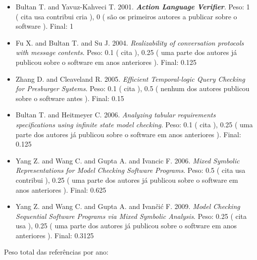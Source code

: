 \begin{itemize}
\item Bultan T. and Yavuz-Kahveci T.
      2001.
        \textbf{\textit{ Action Language Verifier}}.
      Peso:
      1 (
          cita
          usa
          contribui
          cria
      ),
      0 (
são os primeiros autores a publicar sobre o software
      ).
      Final:
      1

\item Fu X. and Bultan T. and Su J.
      2004.
        \textit{ Realizability of conversation protocols with message contents}.
      Peso:
      0.1 (
          cita
      ),
      0.25 (
uma parte dos autores já publicou sobre o software em anos anteriores
      ).
      Final:
      0.125

\item Zhang D. and Cleaveland R.
      2005.
        \textit{ Efficient Temporal-logic Query Checking for Presburger Systems}.
      Peso:
      0.1 (
          cita
      ),
      0.5 (
nenhum dos autores publicou sobre o software antes
      ).
      Final:
      0.15

\item Bultan T. and Heitmeyer C.
      2006.
        \textit{ Analyzing tabular requirements specifications using infinite state model checking}.
      Peso:
      0.1 (
          cita
      ),
      0.25 (
uma parte dos autores já publicou sobre o software em anos anteriores
      ).
      Final:
      0.125

\item Yang Z. and Wang C. and Gupta A. and Ivancic F.
      2006.
        \textit{ Mixed Symbolic Representations for Model Checking Software Programs}.
      Peso:
      0.5 (
          cita
          usa
          contribui
      ),
      0.25 (
uma parte dos autores já publicou sobre o software em anos anteriores
      ).
      Final:
      0.625

\item Yang Z. and Wang C. and Gupta A. and Ivan\v{c}i\'{c} F.
      2009.
        \textit{ Model Checking Sequential Software Programs via Mixed Symbolic Analysis}.
      Peso:
      0.25 (
          cita
          usa
      ),
      0.25 (
uma parte dos autores já publicou sobre o software em anos anteriores
      ).
      Final:
      0.3125

\end{itemize}

Peso total das referências por ano:

